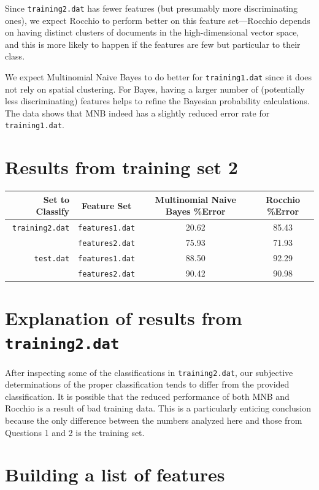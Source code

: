 \documentclass[11pt]{article}
\begin{document}
Since \texttt{training2.dat} has fewer features (but presumably more discriminating ones), we expect Rocchio
to perform better on this feature set---Rocchio depends on having distinct clusters of documents in the
high-dimensional vector space, and this is more likely to happen if the features are few but particular
to their class.

We expect Multinomial Naive Bayes to do better for \texttt{training1.dat} since it does not rely on
spatial clustering. For Bayes, having a larger number of (potentially less discriminating) features
helps to refine the Bayesian probability calculations. The data shows that MNB indeed has a slightly
reduced error rate for \texttt{training1.dat}.

\section{Results from training set 2}

\centering
\begin{tabular}{r|c|c|c}
\textbf{Set to Classify} & \textbf{Feature Set} & \textbf{Multinomial Naive Bayes \%Error} & \textbf{Rocchio \%Error} \\
\hline
\texttt{training2.dat} & \texttt{features1.dat} & 20.62 & 85.43 \\
& \texttt{features2.dat} & 75.93 & 71.93 \\
\texttt{test.dat} & \texttt{features1.dat} & 88.50 & 92.29\\
& \texttt{features2.dat} & 90.42 & 90.98 \\
\end{tabular}
\flushleft

\section{Explanation of results from \texttt{training2.dat}}

After inspecting some of the classifications in \texttt{training2.dat}, our subjective determinations of
the proper classification tends to differ from the provided classification. It is possible that the reduced
performance of both MNB and Rocchio is a result of bad training data. This is a particularly enticing conclusion because
the only difference between the numbers analyzed here and those from Questions 1 and 2 is the training set.

\section{Building a list of features}
\end{document}
